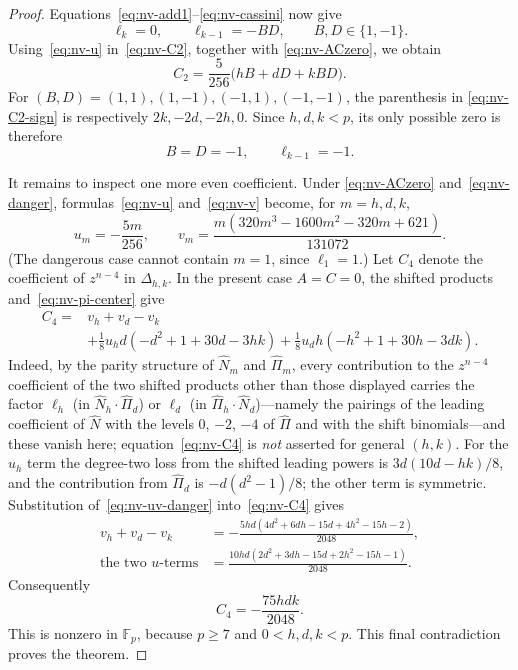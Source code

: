 \begin{proof}
Equations~\eqref{eq:nv-add1}--\eqref{eq:nv-cassini} now give
\[
 \ell_k=0,\qquad \ell_{k-1}=-BD,\qquad B,D\in\{1,-1\}.
\]
Using~\eqref{eq:nv-u} in~\eqref{eq:nv-C2}, together with
\eqref{eq:nv-ACzero},
we obtain
\begin{equation}
 C_2=\frac5{256}\bigl(hB+dD+kBD\bigr).
                                                        \label{eq:nv-C2-sign}
\end{equation}
For $(B,D)=(1,1),(1,-1),(-1,1),(-1,-1)$, the parenthesis in
\eqref{eq:nv-C2-sign}
is respectively $2k,-2d,-2h,0$.  Since $h,d,k<p$, its only possible
zero is therefore
\begin{equation}
 B=D=-1,\qquad \ell_{k-1}=-1.
                                                        \label{eq:nv-danger}
\end{equation}

It remains to inspect one more even coefficient.  Under
\eqref{eq:nv-ACzero} and~\eqref{eq:nv-danger},
formulas~\eqref{eq:nv-u} and~\eqref{eq:nv-v} become, for
$m=h,d,k$,
\begin{equation}
 u_m=-\frac{5m}{256},\qquad
 v_m=\frac{m(320m^3-1600m^2-320m+621)}{131072}.
                                                        \label{eq:nv-uv-danger}
\end{equation}
(The dangerous case cannot contain $m=1$, since $\ell_1=1$.)
Let $C_4$ denote the coefficient of $z^{n-4}$ in $\Delta_{h,k}$.
In the present case $A = C = 0$, the shifted products
and~\eqref{eq:nv-pi-center} give
\begin{align}
 C_4={}&v_h+v_d-v_k\\
 &+\frac18u_hd(-d^2+1+30d-3hk)
  +\frac18u_dh(-h^2+1+30h-3dk).                        \label{eq:nv-C4}
\end{align}
Indeed, by the parity structure of $\widehat N_m$ and
$\widehat\Pi_m$, every contribution to the $z^{n-4}$
coefficient of the two shifted products other than those
displayed carries the factor $\ell_h$ (in
$\widehat N_h\cdot\widehat\Pi_d$) or $\ell_d$ (in
$\widehat\Pi_h\cdot\widehat N_d$)---namely the pairings
of the leading coefficient of $\widehat N$ with the
levels $0$, $-2$, $-4$ of $\widehat\Pi$ and with the
shift binomials---and these vanish here;
equation~\eqref{eq:nv-C4} is \emph{not} asserted for
general $(h,k)$.
For the $u_h$ term the degree-two loss from the shifted leading
powers is $3d(10d-hk)/8$, and the contribution from
$\widehat\Pi_d$ is $-d(d^2-1)/8$; the other term is symmetric.
Substitution of~\eqref{eq:nv-uv-danger} into~\eqref{eq:nv-C4} gives
\begin{align*}
 v_h+v_d-v_k
 &=-\frac{5hd(4d^2+6dh-15d+4h^2-15h-2)}{2048},\\
 \text{the two $u$-terms}
 &=\frac{10hd(2d^2+3dh-15d+2h^2-15h-1)}{2048}.
\end{align*}
Consequently
\[
 C_4=-\frac{75hdk}{2048}.
\]
This is nonzero in $\mathbb F_p$, because $p\geq7$ and
$0<h,d,k<p$.  This final contradiction proves the theorem.
\end{proof}

